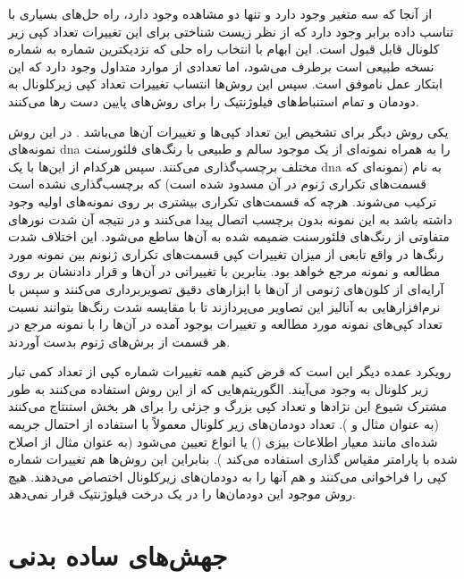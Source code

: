 از آنجا که سه متغیر وجود دارد و تنها دو مشاهده وجود دارد، راه حل‌های بسیاری با تناسب داده برابر وجود دارد که از نظر زیست شناختی برای این تغییرات تعداد کپی زیر کلونال قابل قبول است. این ابهام با انتخاب راه حلی که نزدیکترین شماره به شماره نسخه طبیعی است برطرف می‌شود، اما تعدادی از موارد متداول وجود دارد که این ابتکار عمل ناموفق است. سپس این روش‌ها انتساب تغییرات تعداد کپی زیرکلونال به دودمان و تمام استنباط‌های فیلوژنتیک را برای روش‌های پایین دست رها می‌کنند.

یکی روش دیگر برای تشخیص این تعداد کپی‌ها و تغییرات آن‌ها  می‌باشد \cite{butler2008array}. در این روش نمونه‌های \gls{dna} را به همراه نمونه‌ای از یک موجود سالم و طبیعی با رنگ‌های فلئورسنت مختلف برچسب‌گذاری می‌کنند. سپس هرکدام از این‌ها با یک \gls{dna} به نام  (نمونه‌ای که قسمت‌های تکراری ژنوم در آن مسدود شده است) که برچسب‌گذاری نشده است ترکیب می‌شوند. هرچه که قسمت‌های تکراری بیشتری بر روی نمونه‌های اولیه وجود داشته باشد به این نمونه بدون برچسب اتصال پیدا می‌کنند و در نتیجه آن شدت نورهای متفاوتی از رنگ‌های فلئورسنت ضمیمه شده به آن‌ها ساطع می‌شود. این اختلاف شدت رنگ‌ها در واقع تابعی از میزان تغییرات کپی قسمت‌های تکراری ژنونم بین نمونه مورد مطالعه و نمونه مرجع خواهد بود. بنابرین با تغییراتی در آن‌ها و قرار دادنشان بر روی آرایه‌ای از کلون‌های ژنومی از آن‌ها با ابزارهای دقیق تصویربرداری می‌کنند و سپس با نرم‌افزارهایی به آنالیز این تصاویر می‌پردازند تا با مقایسه شدت رنگ‌ها بتوانند نسبت تعداد کپی‌های نمونه مورد مطالعه و تغییرات بوجود آمده در آن‌ها را با نمونه مرجع در هر قسمت از برش‌های ژنوم بدست آوردند.

رویکرد عمده دیگر این است که فرض کنیم همه تغییرات شماره کپی از تعداد کمی تبار زیر کلونال به وجود می‌آیند. الگوریتم‌هایی که از این روش استفاده می‌کنند به طور مشترک شیوع این نژادها و تعداد کپی بزرگ و جزئی را برای هر بخش استنتاج می‌کنند (به عنوان مثال \cite{zhu2011metabolic, vander2009understanding} و ). تعداد دودمان‌های زیر کلونال معمولاً با استفاده از احتمال جریمه شده‌ای مانند معیار اطلاعات بیزی () یا انواع  تعیین می‌شود (به عنوان مثال  از  اصلاح شده با پارامتر مقیاس گذاری استفاده می‌کند \cite{zhu2011metabolic}). بنابراین این روش‌ها هم تغییرات شماره کپی را فراخوانی می‌کنند و هم آنها را به دودمان‌های زیرکلونال اختصاص می‌دهند. هیچ روش موجود این دودمان‌ها را در یک درخت فیلوژنتیک قرار نمی‌دهد.



\section{جهش‌های ساده بدنی}

